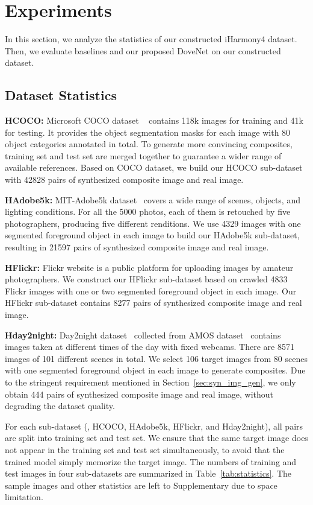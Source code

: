 \documentclass[10pt,twocolumn,letterpaper]{article}
\begin{document}
\section{Experiments}
In this section, we analyze the statistics of our constructed iHarmony4 dataset. Then, we evaluate baselines and our proposed DoveNet on our constructed dataset.

\subsection{Dataset Statistics}
\noindent\textbf{HCOCO: }Microsoft COCO dataset ~\cite{lin2014microsoft} contains 118k images for training and 41k for testing. It provides the object segmentation masks for each image with 80 object categories annotated in total. To generate more convincing composites, training set and test set are merged together to guarantee a wider range of available references. Based on COCO dataset, we build our HCOCO sub-dataset with 42828 pairs of synthesized composite image and real image.

\noindent\textbf{HAdobe5k: }MIT-Adobe5k dataset~ \cite{bychkovsky2011learning} covers a wide range of scenes, objects, and lighting conditions. For all the 5000 photos, each of them is retouched by five photographers, producing five different renditions. We use 4329 images with one segmented foreground object in each image to build our HAdobe5k sub-dataset, resulting in 21597 pairs of synthesized composite image and real image.

\noindent\textbf{HFlickr: }Flickr website is a public platform for uploading images by amateur photographers.
We construct our HFlickr sub-dataset based on crawled 4833 Flickr images with one or two segmented foreground object in each image. Our HFlickr sub-dataset contains 8277 pairs of synthesized composite image and real image.

\noindent\textbf{Hday2night: }Day2night dataset~\cite{zhou2016evaluating} collected from AMOS dataset~\cite{AMOSdataset} contains images taken at different times of the day with fixed webcams. There are 8571 images of 101 different scenes in total. We select 106 target images from 80 scenes with one segmented foreground object in each image to generate composites. Due to the stringent requirement mentioned in Section~\ref{sec:syn_img_gen}, we only obtain 444 pairs of synthesized composite image and real image, without degrading the dataset quality.


For each sub-dataset (\ie, HCOCO, HAdobe5k, HFlickr, and Hday2night), all pairs are split into training set and test set. We ensure that the same target image does not appear in the training set and test set simultaneously, to avoid that the trained model simply memorize the target image. The numbers of training and test images in four sub-datasets are summarized in Table~\ref{tab:statistics}. The sample images and other statistics are left to Supplementary due to space limitation.
\end{document}
